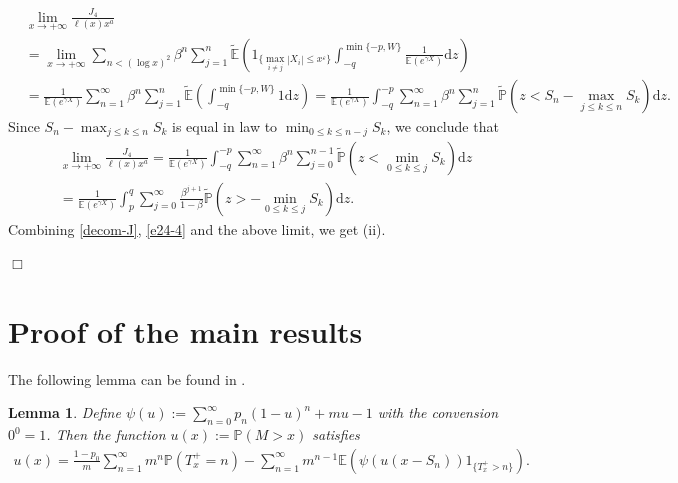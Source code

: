 \documentclass[11pt]{article}
\newtheorem{lemma}[thrm]{Lemma}
\numberwithin{equation}{section}
\begin{document}
\begin{align}
	&\lim_{x\to+\infty} \frac{J_4}{\ell(x)x^a}\nonumber\\
	&= \lim_{x\to+\infty} \sum_{n<(\log x)^2} \beta^{n}\sum_{j=1}^n \widetilde{\mathbb{E}}\left(1_{\{\max_{i\neq  j} |X_i|\leq x^{\varepsilon} \}} \int_{-q}^{\min\{-p, W\}} \frac{1}{\mathbb{E}(e^{\gamma X})} \mathrm{d}z\right)\nonumber\\
	& = \frac{1}{\mathbb{E}(e^{\gamma X})} \sum_{n=1}^\infty \beta^{n}\sum_{j=1}^n \widetilde{\mathbb{E}}\left( \int_{-q}^{\min\{-p, W\}}1   \mathrm{d}z\right) = \frac{1}{\mathbb{E}(e^{\gamma X})} \int_{-q}^{-p} \sum_{n=1}^\infty \beta^{n}\sum_{j=1}^n \widetilde{\mathbb{P}}\left( z< S_n-\max_{j\leq k\leq n} S_k \right)   \mathrm{d}z.
\end{align}
Since $S_n- \max_{j\leq k\leq n}S_k$ is equal in law to $\min_{0\leq k\leq n-j} S_k$, we conclude that
\begin{align}
	&\lim_{x\to+\infty} \frac{J_4}{\ell(x)x^a} = \frac{1}{\mathbb{E}(e^{\gamma X})} \int_{-q}^{-p} \sum_{n=1}^\infty \beta^{n}\sum_{j=0}^{n-1} \widetilde{\mathbb{P}}\left( z < \min_{0\leq k\leq j} S_k \right)   \mathrm{d}z \nonumber\\
	& =  \frac{1}{\mathbb{E}(e^{\gamma X})} \int_p^q \sum_{j=0}^\infty \frac{\beta^{j+1}}{1-\beta} \widetilde{\mathbb{P}}\left(z> -\min_{0\leq k\leq j} S_k \right)\mathrm{d} z. 
\end{align}
Combining \eqref{decom-J}, \eqref{e24-4} and the above limit, we get (ii). 

\hfill$\Box$





\section{Proof of the main results}\label{S4}

The following lemma can be found in \cite[p.23]{HZ2025}.

\begin{lemma}\label{lem3}
	Define $\psi(u):=\sum_{n=0}^\infty p_n(1-u)^n+ mu-1$ with the convension $0^0=1$. Then the function $u(x):= \mathbb{P}(M>x)$ satisfies
	\begin{align}
		u(x)=\frac{1-p_0}{m}\sum_{n=1}^\infty m^{n} \mathbb{P}(T_x^+=n)-\sum_{n=1}^\infty m^{n-1}\mathbb{E}\left( \psi\left(u(x-S_n)\right)1_{\{T_x^+>n\}}\right).
	\end{align}
\end{lemma}
\end{document}
